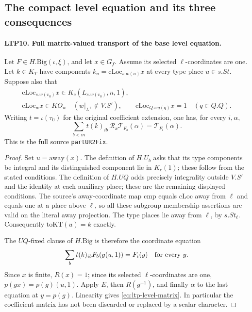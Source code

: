 \subsection{The compact level equation and its three consequences}

\paragraph{LTP10. Full matrix-valued transport of the base level equation.}
\label{claim:LTP10}
Let \(F\in H.\mathrm{Big}(\iota,\xi)\), and let \(x\in G_f\).
Assume its selected \(\ell\)-coordinates are one.  Let \(k\in K_T\)
have components \(k_u=\mathrm{cLoc}_{s.w(u)}x\) at every type
place \(u\in s.St\).  Suppose also that
\[
\begin{gathered}
 \mathrm{cLoc}_{s.w(v_0)}x\in K_c(L_{s.w(v_0)},n,1),\\
 \mathrm{cLoc}_{w}x\in KO_w
                  \quad(w|_{L^+}\notin V.S'),\qquad
 \mathrm{cLoc}_{Q.wq(q)}x=1\quad(q\in Q.Q).
\end{gathered}
\]
Writing \(t=\iota(\tau_0)\) for the original coefficient extension,
one has, for every \(i,\alpha\),
\begin{equation}\label{eq:ltp-level-matrix}
       \sum_{b<m} t(k)_{ib}\,
            \mathscr R_x\mathcal T_{F_b}(\alpha)
                      =\mathcal T_{F_i}(\alpha).
\end{equation}
This is the full source \texttt{partUR2Fix}.
\begin{proof}
Set \(u=\mathrm{away}(x)\).  The definition of \(H.U_b\) asks that
its type components be integral and its distinguished component
lie in \(K_c(1)\); these follow from the stated conditions.
The definition of \(H.UQ\) adds precisely integrality outside
\(V.S'\) and the identity at each auxiliary place; these are the
remaining displayed conditions.  The source's away-coordinate
map \(\mathrm{cmp}\) equals \(\mathrm{cLoc}\) away from \(\ell\)
and equals one at a place above \(\ell\), so all these subgroup
membership assertions are valid on the literal away projection.
The type places lie away from \(\ell\), by \(s.St_\ell\).
Consequently \(\mathrm{toKT}(u)=k\) exactly.

The \(UQ\)-fixed clause of \(H.\mathrm{Big}\) is therefore the
coordinate equation
\[
       \sum_b t(k)_{ib}F_b(y(u,1))=F_i(y)
                     \quad\hbox{for every }y.
\]
Since \(x\) is finite, \(R(x)=1\); since its selected
\(\ell\)-coordinates are one, \(p(gx)=p(g)(u,1)\).
Apply \(E\), then \(R(g^{-1})\), and finally \(\alpha\) to the
last equation at \(y=p(g)\).  Linearity gives
\eqref{eq:ltp-level-matrix}.  In particular the coefficient
matrix has not been discarded or replaced by a scalar character.
\end{proof}

